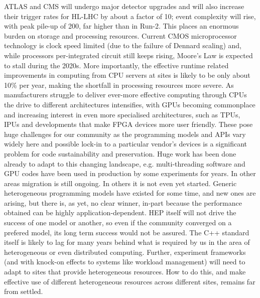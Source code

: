 \documentclass[11pt,a4paper]{article}
\begin{document}
ATLAS and CMS will undergo major detector upgrades and will also
increase their trigger rates for HL-LHC by about a factor of 10; event
complexity will rise, with peak pile-up of 200, far higher than in
Run-2. This places an enormous burden on storage and processing
resources. Current CMOS microprocessor technology is clock speed limited
(due to the failure of Dennard scaling) and, while processors
per-integrated circuit still keeps rising, Moore's Law is expected to
stall during the 2020s. More importantly, the effective runtime related
improvements in computing from CPU servers at sites is likely to be only
about 10\% per year, making the shortfall in processing resources more
severe. As manufacturers struggle to deliver ever-more effective
computing through CPUs the drive to different architectures intensifies,
with GPUs becoming commonplace and increasing interest in even more
specialised architectures, such as TPUs, IPUs and developments that make
FPGA devices more user friendly. These pose huge challenges for our
community as the programming models and APIs vary widely here and
possible lock-in to a particular vendor's devices is a significant
problem for code sustainability and preservation. Huge work has been
done already to adapt to this changing landscape, e.g. multi-threading
software and GPU codes have been used in production by some experiments
for years. In other areas migration is still ongoing. In others it is
not even yet started. Generic heterogeneous programming models have
existed for some time, and new ones are arising, but there is, as yet,
no clear winner, in-part because the performance obtained can be highly
application-dependent. HEP itself will not drive the success of one
model or another, so even if the community converged on a prefered
model, its long term success would not be assured. The C++ standard
itself is likely to lag for many years behind what is required by us in
the area of heterogeneous or even distributed computing. Further,
experiment frameworks (and with knock-on effects to systems like
workload management) will need to adapt to sites that provide
heterogeneous resources. How to do this, and make effective use of
different heterogeneous resources across different sites, remains far
from settled.
\end{document}
